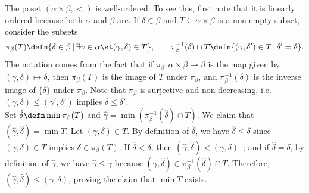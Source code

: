 \begin{remark}
    The poset $(\alpha \times \beta, <)$ is well-ordered. To see this, first note that it is linearly ordered because both $\alpha$ and $\beta$ are. If $\delta \in \beta$ and $T \subseteq \alpha \times \beta$ is a non-empty subset, consider the subsets 
    \[
        \pi_{\beta}(T) \defn \{ \delta \in \beta \, | \, \exists \gamma \in \alpha \st (\gamma,\delta) \in T \}, \qquad \pi_{\beta}^{-1}(\delta) \cap T \defn \{ (\gamma,\delta') \in T \, | \, \delta' = \delta \}.
    \]
    The notation comes from the fact that if $\pi_{\beta} : \alpha \times \beta \to \beta$ is the map given by $(\gamma,\delta) \mapsto \delta$, then $\pi_{\beta}(T)$ is the image of $T$ under $\pi_{\beta}$, and $\pi_{\beta}^{-1}(\delta)$ is the inverse image of $\{\delta\}$ under $\pi_{\beta}$. Note that $\pi_{\beta}$ is surjective and non-decreasing, i.e. $(\gamma,\delta) \le (\gamma', \delta')$ implies $\delta \le \delta'$.
    \\
    
    Set $\hat{\delta} \defn \min \pi_{\beta}(T)$ and $\hat{\gamma} = \min (\pi_{\beta}^{-1}(\hat{\delta}) \cap T)$. We claim that $(\hat{\gamma}, \hat{\delta}) = \min T$. Let $(\gamma,\delta) \in T$. By definition of $\hat{\delta}$, we have $\hat{\delta} \le \delta$ since $(\gamma,\delta) \in T$ implies $\delta \in \pi_{\beta}(T)$. If $\hat{\delta} < \delta$, then $(\hat{\gamma}, \hat{\delta}) < (\gamma,\delta)$~; and if $\hat{\delta} = \delta$, by definition of $\hat{\gamma}$, we have $\hat{\gamma} \le \gamma$ because $(\gamma,\hat{\delta}) \in \pi_{\beta}^{-1}(\hat{\delta}) \cap T$. Therefore, $(\hat{\gamma}, \hat{\delta}) \le (\gamma,\delta)$, proving the claim that $\min T$ exists.
\end{remark}

